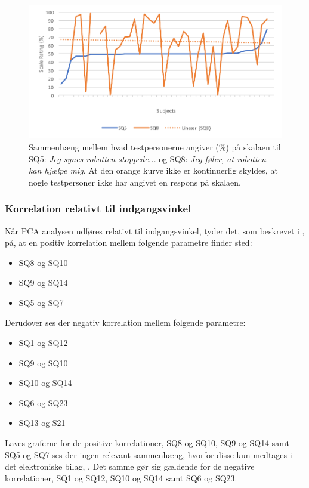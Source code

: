 \begin{figure}[H]
	\centering
	\includegraphics[width=\textwidth]{Figure/Korrelationsgrafer/SQ5+SQ8}
	\caption{Sammenhæng mellem hvad testpersonerne angiver (\%) på skalaen til SQ5: \textit{Jeg synes robotten stoppede...} og SQ8: \textit{Jeg føler, at robotten kan hjælpe mig}. At den orange kurve ikke er kontinuerlig skyldes, at nogle testpersoner ikke har angivet en respons på skalaen.}
	\label{fig:SammenligningSQ5SQ8}
\end{figure}

\subsubsection{Korrelation relativt til indgangsvinkel}
Når PCA analysen udføres relativt til indgangsvinkel, tyder det, som beskrevet i , på, at en positiv korrelation mellem følgende parametre finder sted:
\begin{itemize}
	\item SQ8 og SQ10
	\item SQ9 og SQ14
	\item SQ5 og SQ7
\end{itemize}
%
Derudover ses der negativ korrelation mellem følgende parametre:
\begin{itemize}
	\item SQ1 og SQ12
	\item SQ9 og SQ10
	\item SQ10 og SQ14
	\item SQ6 og SQ23
	\item SQ13 og S21
\end{itemize}
%
Laves graferne for de positive korrelationer, SQ8 og SQ10, SQ9 og SQ14 samt SQ5 og SQ7 ses der ingen relevant sammenhæng, hvorfor disse kun medtages i det elektroniske bilag, . Det samme gør sig gældende for de negative korrelationer, SQ1 og SQ12, SQ10 og SQ14 samt SQ6 og SQ23. 

